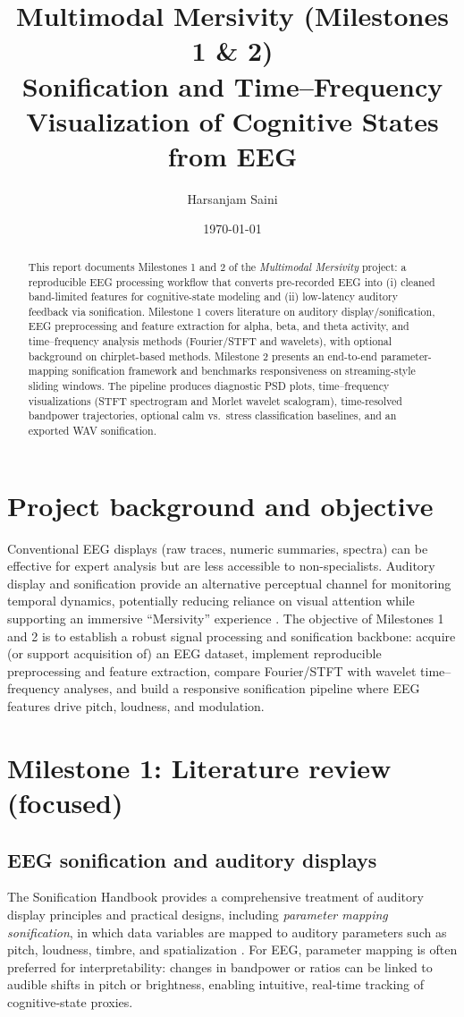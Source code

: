 \documentclass[11pt]{article}
\title{\textbf{Multimodal Mersivity (Milestones 1 \& 2)}\\
\large Sonification and Time--Frequency Visualization of Cognitive States from EEG}
\author{Harsanjam Saini}
\date{\today}
\begin{document}
\maketitle

\begin{abstract}
This report documents Milestones 1 and 2 of the \emph{Multimodal Mersivity} project: a reproducible EEG processing workflow that converts pre-recorded EEG into (i) cleaned band-limited features for cognitive-state modeling and (ii) low-latency auditory feedback via sonification. Milestone 1 covers literature on auditory display/sonification, EEG preprocessing and feature extraction for alpha, beta, and theta activity, and time--frequency analysis methods (Fourier/STFT and wavelets), with optional background on chirplet-based methods. Milestone 2 presents an end-to-end parameter-mapping sonification framework and benchmarks responsiveness on streaming-style sliding windows. The pipeline produces diagnostic PSD plots, time--frequency visualizations (STFT spectrogram and Morlet wavelet scalogram), time-resolved bandpower trajectories, optional calm vs.\ stress classification baselines, and an exported WAV sonification.
\end{abstract}

\section{Project background and objective}
Conventional EEG displays (raw traces, numeric summaries, spectra) can be effective for expert analysis but are less accessible to non-specialists. Auditory display and sonification provide an alternative perceptual channel for monitoring temporal dynamics, potentially reducing reliance on visual attention while supporting an immersive ``Mersivity'' experience \cite{hermann2011}. The objective of Milestones 1 and 2 is to establish a robust signal processing and sonification backbone: acquire (or support acquisition of) an EEG dataset, implement reproducible preprocessing and feature extraction, compare Fourier/STFT with wavelet time--frequency analyses, and build a responsive sonification pipeline where EEG features drive pitch, loudness, and modulation.

\section{Milestone 1: Literature review (focused)}
\subsection{EEG sonification and auditory displays}
The Sonification Handbook provides a comprehensive treatment of auditory display principles and practical designs, including \emph{parameter mapping sonification}, in which data variables are mapped to auditory parameters such as pitch, loudness, timbre, and spatialization \cite{hermann2011}. For EEG, parameter mapping is often preferred for interpretability: changes in bandpower or ratios can be linked to audible shifts in pitch or brightness, enabling intuitive, real-time tracking of cognitive-state proxies.
\end{document}
